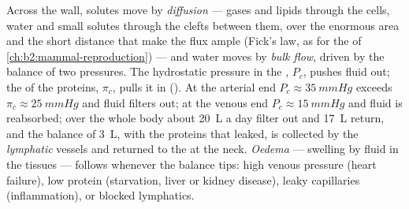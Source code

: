 \begin{proposition}\label{prop:b2:blood-circulation:exchange}
Across the  wall, solutes move by \emph{diffusion} --- gases
and lipids through the cells, water and small solutes through the
clefts between them, over the enormous area and the short distance
that make the flux ample (Fick's law, as for the  of
\cref{ch:b2:mammal-reproduction}) --- and water moves by
\emph{bulk flow}, driven by the balance of two pressures. The
hydrostatic pressure in the , $P_c$, pushes fluid out; the
 of the  proteins, $\pi_c$, pulls it in
(\emph{}). At the arterial end $P_c \approx
\qty{35}{mmHg}$ exceeds $\pi_c \approx \qty{25}{mmHg}$ and fluid
filters out; at the venous end $P_c \approx \qty{15}{mmHg}$ and fluid
is reabsorbed; over the whole body about \qty{20}{L} a day filter
out and \qty{17}{L} return, and the balance of \qty{3}{L}, with the
proteins that leaked, is collected by the \emph{lymphatic} vessels
and returned to the  at the neck. \emph{Oedema} --- swelling
by fluid in the tissues --- follows whenever the balance tips:
high venous pressure (heart failure), low  protein
(starvation, liver or kidney disease), leaky capillaries
(inflammation), or blocked lymphatics.
\end{proposition}

